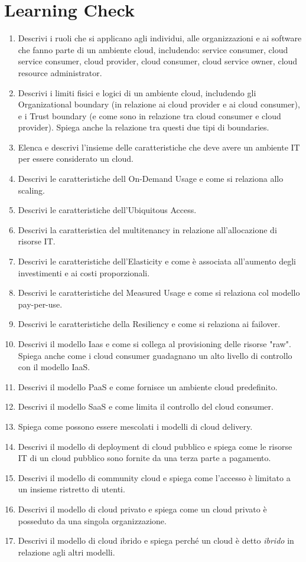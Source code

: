 \section{Learning Check}
\begin{enumerate}
    \item Descrivi i ruoli che si applicano agli individui, alle organizzazioni e ai software che fanno parte di un ambiente cloud, includendo: service consumer, cloud service consumer, cloud provider, cloud consumer, cloud service owner, cloud resource administrator.
    \item Descrivi i limiti fisici e logici di un ambiente cloud, includendo gli Organizational boundary (in relazione ai cloud provider e ai cloud consumer), e i Trust boundary (e come sono in relazione tra cloud consumer e cloud provider). Spiega anche la relazione tra questi due tipi di boundaries.
    \item Elenca e descrivi l'insieme delle caratteristiche che deve avere un ambiente IT per essere considerato un cloud.
    \item Descrivi le caratteristiche dell On-Demand Usage e come si relaziona allo scaling.
    \item Descrivi le caratteristiche dell'Ubiquitous Access.
    \item Descrivi la caratteristica del multitenancy in relazione all'allocazione di risorse IT.
    \item Descrivi le caratteristiche dell'Elasticity e come è associata all'aumento degli investimenti e ai costi proporzionali.
    \item Descrivi le caratteristiche del Measured Usage e come si relaziona col modello pay-per-use.
    \item Descrivi le caratteristiche della Resiliency e come si relaziona ai failover.
    \item Descrivi il modello Iaas e come si collega al provisioning delle risorse "raw". Spiega anche come i cloud consumer guadagnano un alto livello di controllo con il modello IaaS.
    \item Descrivi il modello PaaS e come fornisce un ambiente cloud predefinito.
    \item Descrivi il modello SaaS e come limita il controllo del cloud consumer.
    \item Spiega come possono essere mescolati i modelli di cloud delivery.
    \item Descrivi il modello di deployment di cloud pubblico e spiega come le risorse IT di un cloud pubblico sono fornite da una terza parte a pagamento.
    \item Descrivi il modello di community cloud e spiega come l'accesso è limitato a un insieme ristretto di utenti.
    \item Descrivi il modello di cloud privato e spiega come un cloud privato è posseduto da una singola organizzazione.
    \item Descrivi il modello di cloud ibrido e spiega perché un cloud è detto \textit{ibrido} in relazione agli altri modelli.
\end{enumerate}


